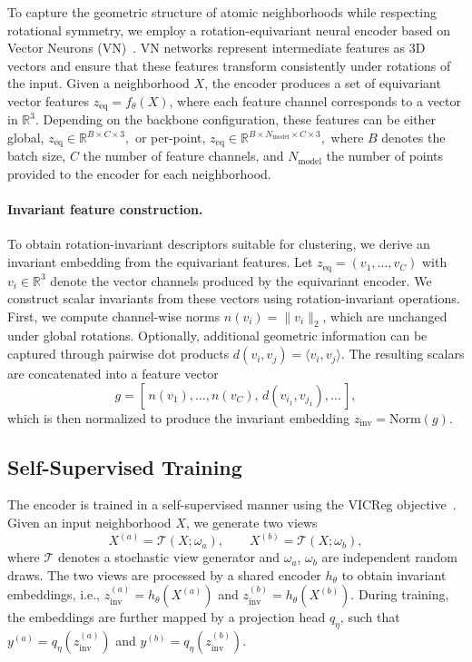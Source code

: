 \documentclass[runningheads]{llncs}
\begin{document}
To capture the geometric structure of atomic neighborhoods while respecting rotational symmetry, we employ a rotation-equivariant neural encoder based on Vector Neurons (VN)~\cite{Deng2021VN}. VN networks represent intermediate features as 3D vectors and ensure that these features transform consistently under rotations of the input. Given a neighborhood $X$, the encoder produces a set of equivariant vector features $z_{\mathrm{eq}} = f_\theta(X)$, where each feature channel corresponds to a vector in $\mathbb{R}^3$.
Depending on the backbone configuration, these features can be either global, $
z_{\mathrm{eq}} \in \mathbb{R}^{B \times C \times 3},
$
or per-point,
$
z_{\mathrm{eq}} \in \mathbb{R}^{B \times N_{\text{model}} \times C \times 3},
$ where $B$ denotes the batch size, $C$ the number of feature channels, and $N_{\text{model}}$ the number of points provided to the encoder for each neighborhood.

\paragraph{Invariant feature construction.}
To obtain rotation-invariant descriptors suitable for clustering, we derive an invariant embedding from the equivariant features.
Let $z_{\mathrm{eq}}=(v_1,\dots,v_C)$ with $v_i\in\mathbb{R}^3$ denote the vector channels produced by the equivariant encoder. We construct scalar invariants from these vectors using rotation-invariant operations.
First, we compute channel-wise norms $n(v_i)=\|v_i\|_2$, which are unchanged under global rotations.
Optionally, additional geometric information can be captured through pairwise dot products $d(v_i,v_j)=\langle v_i,v_j\rangle$.
The resulting scalars are concatenated into a feature vector
\[
g=[\,n(v_1),\dots,n(v_C),\,d(v_{i_1},v_{j_1}),\dots\,],
\]
which is then normalized to produce the invariant embedding $z_{\mathrm{inv}}=\mathrm{Norm}(g)$.

\subsection{Self-Supervised Training}
\label{sec:sst}

The encoder is trained in a self-supervised manner using the VICReg objective~\cite{bardes2022vicreg}.
Given an input neighborhood $X$, we generate two views
$$
X^{(a)}=\mathcal{T}(X;\omega_a), \qquad
X^{(b)}=\mathcal{T}(X;\omega_b),
$$
where $\mathcal{T}$ denotes a stochastic view generator and $\omega_a$, $\omega_b$ are independent random draws. The two views are processed by a shared encoder $h_\theta$ to obtain invariant embeddings, i.e.,
$
z^{(a)}_{\mathrm{inv}} = h_\theta(X^{(a)})$ and
$
z^{(b)}_{\mathrm{inv}} = h_\theta(X^{(b)}).
$
During training, the embeddings are further mapped by a projection head $q_\eta$, such that
$
y^{(a)} = q_\eta(z^{(a)}_{\mathrm{inv}})$ and
$y^{(b)} = q_\eta(z^{(b)}_{\mathrm{inv}}).
$
\end{document}
